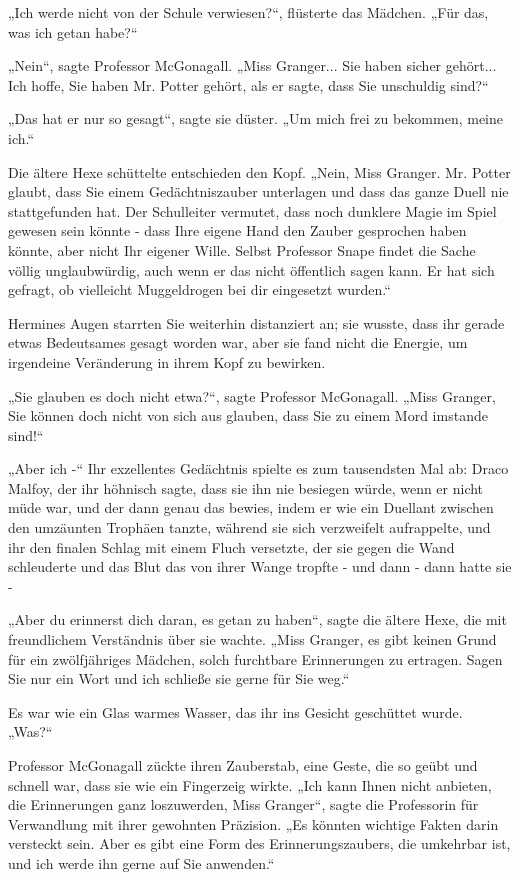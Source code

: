 {„Ich werde nicht von der Schule verwiesen?“, flüsterte das Mädchen. „Für das, was ich getan habe?“

„Nein“, sagte Professor McGonagall. „Miss Granger... Sie haben sicher gehört... Ich hoffe, Sie haben Mr. Potter gehört, als er sagte, dass Sie unschuldig sind?“

„Das hat er nur so gesagt“, sagte sie düster. „Um mich frei zu bekommen, meine ich.“

Die ältere Hexe schüttelte entschieden den Kopf. „Nein, Miss Granger. Mr. Potter glaubt, dass Sie einem Gedächtniszauber unterlagen und dass das ganze Duell nie stattgefunden hat. Der Schulleiter vermutet, dass noch dunklere Magie im Spiel gewesen sein könnte - dass Ihre eigene Hand den Zauber gesprochen haben könnte, aber nicht Ihr eigener Wille. Selbst Professor Snape findet die Sache völlig unglaubwürdig, auch wenn er das nicht öffentlich sagen kann. Er hat sich gefragt, ob vielleicht Muggeldrogen bei dir eingesetzt wurden.“

Hermines Augen starrten Sie weiterhin distanziert an; sie wusste, dass ihr gerade etwas Bedeutsames gesagt worden war, aber sie fand nicht die Energie, um irgendeine Veränderung in ihrem Kopf zu bewirken.

„Sie glauben es doch nicht etwa?“, sagte Professor McGonagall. „Miss Granger, Sie können doch nicht von sich aus glauben, dass Sie zu einem Mord imstande sind!“

„Aber ich -“ Ihr exzellentes Gedächtnis spielte es zum tausendsten Mal ab: Draco Malfoy, der ihr höhnisch sagte, dass sie ihn nie besiegen würde, wenn er nicht müde war, und der dann genau das bewies, indem er wie ein Duellant zwischen den umzäunten Trophäen tanzte, während sie sich verzweifelt aufrappelte, und ihr den finalen Schlag mit einem Fluch versetzte, der sie gegen die Wand schleuderte und das Blut das von ihrer Wange tropfte - und dann - dann hatte sie -

„Aber du erinnerst dich daran, es getan zu haben“, sagte die ältere Hexe, die mit freundlichem Verständnis über sie wachte. „Miss Granger, es gibt keinen Grund für ein zwölfjähriges Mädchen, solch furchtbare Erinnerungen zu ertragen. Sagen Sie nur ein Wort und ich schließe sie gerne für Sie weg.“

Es war wie ein Glas warmes Wasser, das ihr ins Gesicht geschüttet wurde.\\ „Was?“

Professor McGonagall zückte ihren Zauberstab, eine Geste, die so geübt und schnell war, dass sie wie ein Fingerzeig wirkte. „Ich kann Ihnen nicht anbieten, die Erinnerungen ganz loszuwerden, Miss Granger“, sagte die Professorin für Verwandlung mit ihrer gewohnten Präzision. „Es könnten wichtige Fakten darin versteckt sein. Aber es gibt eine Form des Erinnerungszaubers, die umkehrbar ist, und ich werde ihn gerne auf Sie anwenden.“

}
